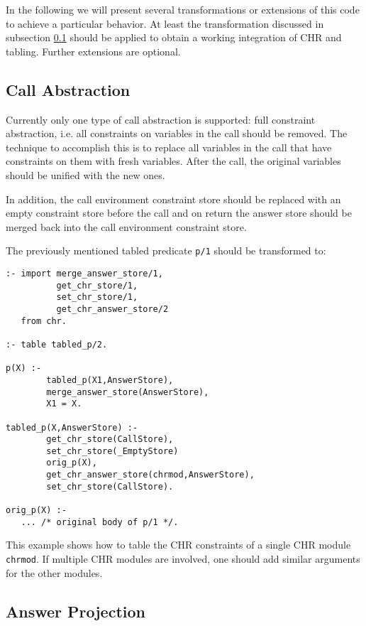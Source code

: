 In the following we will present several transformations or extensions of
this code to achieve a particular behavior. At least the transformation
discussed in subsection \ref{abstraction} should be applied to obtain a
working integration of CHR and tabling. Further extensions are optional.

\subsection{Call Abstraction} \label{abstraction}

Currently only one type of call abstraction is supported: full constraint
abstraction, i.e. all constraints on variables in the call should be
removed. The technique to accomplish this is to replace all variables in
the call that have constraints on them with fresh variables. After the call,
the original variables should be unified with the new ones.

In addition, the call environment constraint store should be replaced with an
empty constraint store before the call and on return the answer store should be merged
back into the call environment constraint store.

The previously mentioned tabled predicate \texttt{p/1} should be transformed
 to:

\begin{small}
\begin{verbatim}
:- import merge_answer_store/1, 
          get_chr_store/1,
          set_chr_store/1,
          get_chr_answer_store/2
   from chr.

:- table tabled_p/2.

p(X) :-
        tabled_p(X1,AnswerStore),
        merge_answer_store(AnswerStore),
        X1 = X.

tabled_p(X,AnswerStore) :-
        get_chr_store(CallStore),
        set_chr_store(_EmptyStore)
        orig_p(X),
        get_chr_answer_store(chrmod,AnswerStore),
        set_chr_store(CallStore).

orig_p(X) :-
   ... /* original body of p/1 */.
\end{verbatim}
\end{small}

This example shows how to table the CHR constraints of a single CHR module
\texttt{chrmod}. If multiple CHR modules are involved, one should add similar
arguments for the other modules.

\subsection{Answer Projection}

